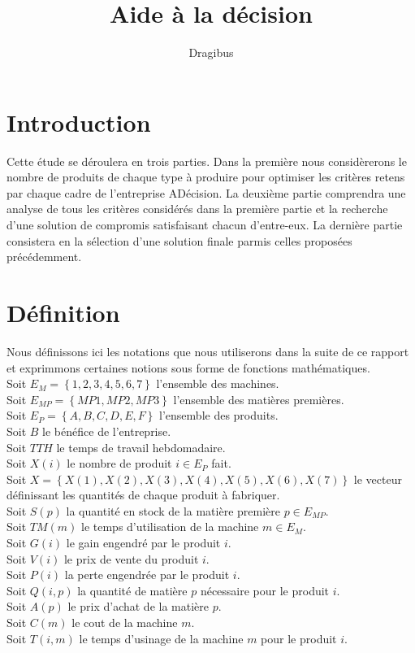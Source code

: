 \documentclass[a4paper, 11pt]{article}
\title{Aide à la décision}
\author{Dragibus}
\date{}
\begin{document}
\maketitle
\tableofcontents
\newpage

\section{Introduction}
	Cette étude se déroulera en trois parties. Dans la première nous considèrerons le nombre de produits de chaque type à produire pour optimiser les critères retens par chaque cadre de l'entreprise ADécision. La deuxième partie comprendra une analyse de tous les critères considérés dans la première partie et la recherche d'une solution de compromis satisfaisant chacun d'entre-eux. La dernière partie consistera en la sélection d'une solution finale parmis celles proposées précédemment.

\section{Définition}
Nous définissons ici les notations que nous utiliserons dans la suite de ce rapport et exprimmons certaines notions sous forme de fonctions mathématiques. \\
Soit $E_M = \left\{1, 2, 3, 4, 5, 6, 7\right\} $ l'ensemble des machines. \\
Soit $E_{MP} = \left\{MP1, MP2, MP3\right\} $ l'ensemble des matières premières. \\
Soit $E_P = \left\{A, B, C, D, E, F\right\} $ l'ensemble des produits. \\
Soit $B$ le bénéfice de l'entreprise. \\
Soit $TTH$ le temps de travail hebdomadaire. \\
Soit $X(i)$ le nombre de produit $i\in E_P$ fait. \\
Soit $X = \left\{X(1), X(2), X(3), X(4), X(5), X(6), X(7)\right\}$ le vecteur définissant les quantités de chaque produit à fabriquer.\\
Soit $S(p)$ la quantité en stock de la matière première $p\in E_{MP}$. \\
Soit $TM(m)$ le temps d'utilisation de la machine $m\in E_M$.\\
Soit $G(i)$ le gain engendré par le produit $i$. \\
Soit $V(i)$ le prix de vente du produit $i$. \\
Soit $P(i)$ la perte engendrée par le produit $i$. \\
Soit $Q(i, p)$ la quantité de matière $p$ nécessaire pour le produit $i$. \\
Soit $A(p)$ le prix d'achat de la matière $p$. \\
Soit $C(m)$ le cout de la machine $m$. \\
Soit $T(i, m)$ le temps d'usinage de la machine $m$ pour le produit $i$. \\
\end{document}
